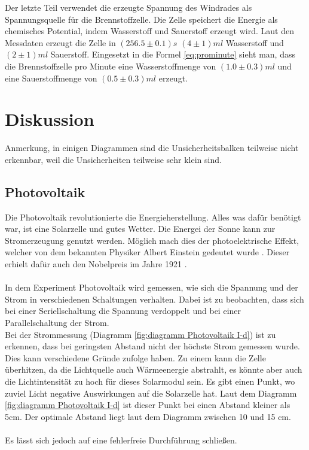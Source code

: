 \documentclass[12pt,a4paper,twoside]{article}
\begin{document}
\noindent
Der letzte Teil verwendet die erzeugte Spannung des Windrades als Spannungsquelle für die Brennstoffzelle. Die Zelle speichert die Energie als chemisches Potential, indem Wasserstoff und Sauerstoff erzeugt wird. 
Laut den Messdaten erzeugt die Zelle in $(256.5 \pm 0.1)s$ $(4 \pm 1)ml$ Wasserstoff und $(2 \pm 1)ml$ Sauerstoff. 
Eingesetzt in die Formel \ref{eq:prominute} sieht man, dass die Brennstoffzelle pro Minute eine Wasserstoffmenge von $(1.0 \pm 0.3)ml$ und eine Sauerstoffmenge von $(0.5 \pm 0.3)ml$ erzeugt. 

\section{Diskussion} %
Anmerkung, in einigen Diagrammen sind die Unsicherheitsbalken teilweise nicht erkennbar, weil die Unsicherheiten teilweise sehr klein sind. 

\subsection{Photovoltaik}
Die Photovoltaik revolutionierte die Energieherstellung. Alles was dafür benötigt war, ist eine Solarzelle und gutes Wetter. Die Energei der Sonne kann zur Stromerzeugung genutzt werden. 
Möglich mach dies der photoelektrische Effekt, welcher von dem bekannten Physiker Albert Einstein gedeutet wurde \cite{wiki1}. Dieser erhielt dafür auch den Nobelpreis im Jahre 1921 \cite{wiki2}. 
\\
\\
In dem Experiment Photovoltaik wird gemessen, wie sich die Spannung und der Strom in verschiedenen Schaltungen verhalten. 
Dabei ist zu beobachten, dass sich bei einer Seriellschaltung die Spannung verdoppelt und bei einer Parallelschaltung der Strom. 
\\
Bei der Strommessung (Diagramm \ref{fig:diagramm Photovoltaik I-d}) ist zu erkennen, dass bei geringsten Abstand nicht der höchste Strom gemessen wurde. 
Dies kann verschiedene Gründe zufolge haben. Zu einem kann die Zelle überhitzen, da die Lichtquelle auch Wärmeenergie abstrahlt, es könnte aber auch die Lichtintensität zu hoch für dieses Solarmodul sein. 
Es gibt einen Punkt, wo zuviel Licht negative Auswirkungen auf die Solarzelle hat. Laut dem Diagramm \ref{fig:diagramm Photovoltaik I-d} ist dieser Punkt bei einen Abstand kleiner als 5cm. Der optimale Abstand liegt laut dem Diagramm zwischen 10 und 15 cm. 
\\
\\
Es lässt sich jedoch auf eine fehlerfreie Durchführung schließen. 
\end{document}
